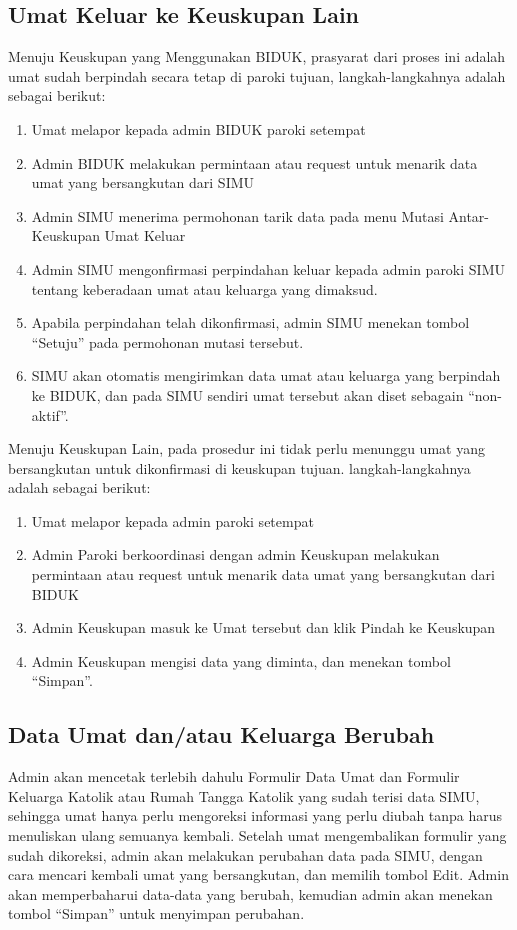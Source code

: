 \subsection{Umat Keluar ke Keuskupan Lain}
\label{sec:umatKeluar}
Menuju Keuskupan yang Menggunakan BIDUK, prasyarat dari proses ini adalah umat sudah berpindah secara tetap di paroki tujuan, langkah-langkahnya adalah sebagai berikut:
\begin{enumerate}
	\item Umat melapor kepada admin BIDUK paroki setempat
	\item Admin BIDUK melakukan permintaan atau request untuk menarik data umat yang bersangkutan dari SIMU
	\item Admin SIMU menerima permohonan tarik data pada menu Mutasi Antar-Keuskupan Umat Keluar
	\item Admin SIMU mengonfirmasi perpindahan keluar kepada admin paroki SIMU tentang keberadaan umat atau keluarga yang dimaksud.
	\item Apabila perpindahan telah dikonfirmasi, admin SIMU menekan tombol “Setuju” pada permohonan mutasi tersebut.
	\item SIMU akan otomatis mengirimkan data umat atau keluarga yang berpindah ke BIDUK, dan pada SIMU sendiri umat tersebut akan diset sebagain “non-aktif”.
\end{enumerate}

Menuju Keuskupan Lain, pada prosedur ini tidak perlu menunggu umat yang bersangkutan untuk dikonfirmasi di keuskupan tujuan. langkah-langkahnya adalah sebagai berikut:
\begin{enumerate}
	\item Umat melapor kepada admin paroki setempat
	\item Admin Paroki berkoordinasi dengan admin Keuskupan melakukan permintaan atau request untuk menarik data umat yang bersangkutan dari BIDUK
	\item Admin Keuskupan masuk ke Umat tersebut dan klik Pindah ke Keuskupan
	\item Admin Keuskupan mengisi data yang diminta, dan menekan tombol “Simpan”.
\end{enumerate}

\subsection{Data Umat dan/atau Keluarga Berubah}
\label{sec:dataBerubah}
Admin akan mencetak terlebih dahulu Formulir Data Umat dan Formulir Keluarga Katolik atau Rumah Tangga Katolik yang sudah terisi data SIMU, sehingga umat hanya perlu mengoreksi informasi yang perlu diubah tanpa harus menuliskan ulang semuanya kembali. Setelah umat mengembalikan formulir yang sudah dikoreksi, admin akan melakukan perubahan data pada SIMU, dengan cara mencari kembali umat yang bersangkutan, dan memilih tombol Edit. Admin akan memperbaharui data-data yang berubah, kemudian admin akan menekan tombol “Simpan” untuk menyimpan perubahan.

